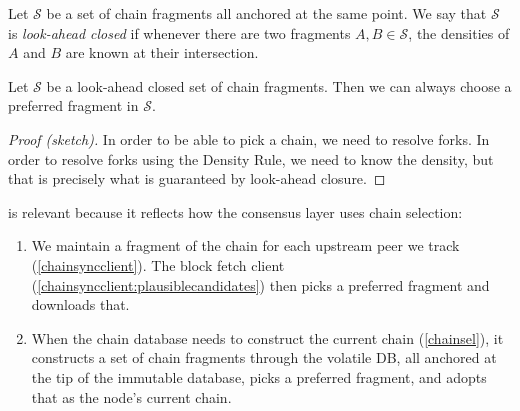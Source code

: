 \begin{definition}
\label{lookahead-closure}
Let $\mathcal{S}$ be a set of chain fragments all anchored at the same point. We
say that $\mathcal{S}$ is \emph{look-ahead closed} if whenever there are two
fragments $A, B \in \mathcal{S}$, the densities of $A$ and $B$ are known at
their intersection.
\end{definition}

\begin{lemma}
\label{lemma:fragment-selection}
Let $\mathcal{S}$ be a look-ahead closed set of chain fragments. Then
we can always choose a preferred fragment in $\mathcal{S}$.
\end{lemma}

\begin{proof}[Proof (sketch)]
In order to be able to pick a chain, we need to resolve forks. In order to
resolve forks using the Density Rule, we need to know the density, but that
is precisely what is guaranteed by look-ahead closure.
\end{proof}

\pagebreak

 is relevant because it reflects how the
consensus layer uses chain selection:

\begin{enumerate}
\item We maintain a fragment of the chain for each upstream peer we track
(\cref{chainsyncclient}). The block fetch client
(\cref{chainsyncclient:plausiblecandidates}) then picks a preferred fragment and
downloads that.
\item When the chain database needs to construct the current chain
(\cref{chainsel}), it constructs a set of chain fragments through the volatile
DB, all anchored at the tip of the immutable database, picks a preferred
fragment, and adopts that as the node's current chain.
\end{enumerate}

